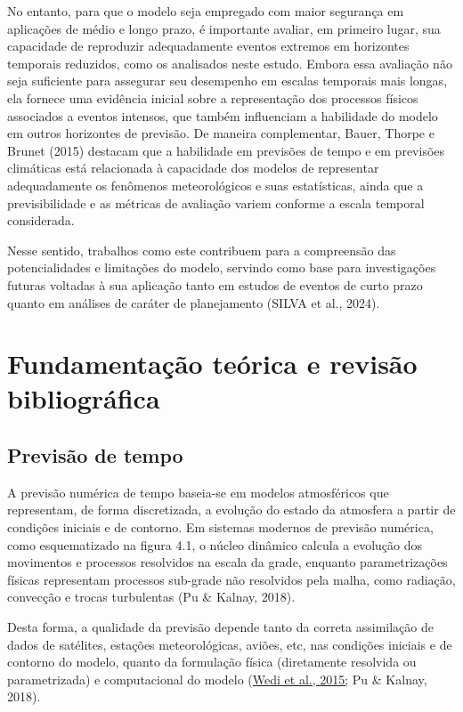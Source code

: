 \documentclass[12pt,a4paper,oneside]{book}
\begin{document}
No entanto, para que o modelo seja empregado com maior segurança em aplicações de médio e longo prazo, é importante avaliar, em primeiro lugar, sua capacidade de reproduzir adequadamente eventos extremos em horizontes temporais reduzidos, como os analisados neste estudo. Embora essa avaliação não seja suficiente para assegurar seu desempenho em escalas temporais mais longas, ela fornece uma evidência inicial sobre a representação dos processos físicos associados a eventos intensos, que também influenciam a habilidade do modelo em outros horizontes de previsão. De maneira complementar, Bauer, Thorpe e Brunet (2015) destacam que a habilidade em previsões de tempo e em previsões climáticas está relacionada à capacidade dos modelos de representar adequadamente os fenômenos meteorológicos e suas estatísticas, ainda que a previsibilidade e as métricas de avaliação variem conforme a escala temporal considerada.

Nesse sentido, trabalhos como este contribuem para a compreensão das potencialidades e limitações do modelo, servindo como base para investigações futuras voltadas à sua aplicação tanto em estudos de eventos de curto prazo quanto em análises de caráter de planejamento (SILVA et al., 2024).

\chapter{Fundamentação teórica e revisão bibliográfica}

\section{Previsão de tempo}

A previsão numérica de tempo baseia-se em modelos atmosféricos que representam, de forma discretizada, a evolução do estado da atmosfera a partir de condições iniciais e de contorno. Em sistemas modernos de previsão numérica, como esquematizado na figura 4.1, o núcleo dinâmico calcula a evolução dos movimentos e processos resolvidos na escala da grade, enquanto parametrizações físicas representam processos sub-grade não resolvidos pela malha, como radiação, convecção e trocas turbulentas (Pu \& Kalnay, 2018).

Desta forma, a qualidade da previsão depende tanto da correta assimilação de dados de satélites, estações meteorológicas, aviões, etc, nas condições iniciais e de contorno do modelo, quanto da formulação física (diretamente resolvida ou parametrizada) e computacional do modelo (\href{https://www.ecmwf.int/sites/default/files/elibrary/2015/15259-modelling-infrastructure-integrated-forecasting-system-recent-advances-and-future-challenges.pdf}{Wedi et al., 2015;} Pu \& Kalnay, 2018).
\end{document}
